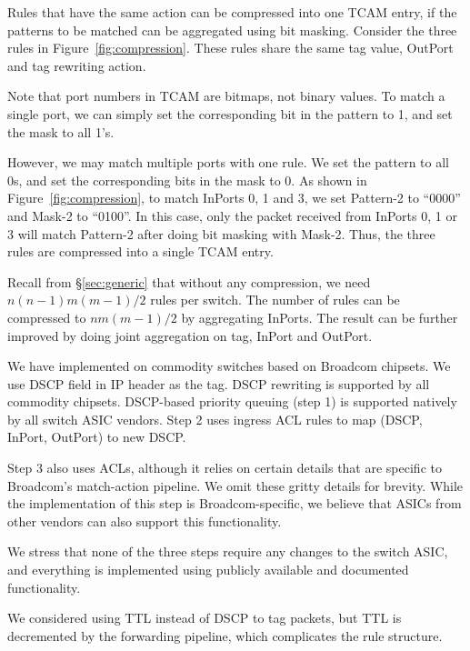 Rules that have the same action can be compressed into one TCAM entry, if the
patterns to be matched can be aggregated using bit masking. Consider the three
rules in Figure~\ref{fig:compression}. These rules share the same tag value,
OutPort and tag rewriting action.

Note that port numbers in TCAM are bitmaps, not binary values. To match a single 
port, we can simply set the corresponding bit in the pattern to 1, and set the mask to all 1's. 

However, we may match multiple ports with one rule. We set the pattern to 
all 0s, and set the corresponding bits in the mask to 0. As shown in Figure~\ref{fig:compression},  
to match InPorts 0, 1 and 3, we set Pattern-2 to ``0000''  and Mask-2 to ``0100''. In this case, 
only the packet received from InPorts 0, 1 or 3 will match Pattern-2 after doing bit masking with Mask-2. 
Thus, the three \sysname{} rules are compressed into a single TCAM entry.

Recall from \S\ref{sec:generic} that without any compression, we need
$n(n-1)m(m-1)/2$ rules per switch. The number of rules can be
compressed to $nm(m-1)/2$ by aggregating InPorts.  The
result can be further improved by doing joint aggregation on tag, InPort and
OutPort.

 We have implemented \sysname{} on commodity
switches based on Broadcom chipsets.  We use DSCP field in IP header as the tag.
DSCP rewriting is supported by all commodity chipsets. DSCP-based priority
queuing (step 1) is supported natively by all switch ASIC vendors. Step 2 uses
ingress ACL rules to map (DSCP, InPort, OutPort) to new DSCP.

Step 3 also uses ACLs, although it relies on certain details that are specific
to Broadcom's match-action pipeline. We omit these gritty details for brevity.
While the implementation of this step is Broadcom-specific, we believe that
ASICs from other vendors can also support this functionality.

We stress that none of the three steps require any changes to the switch ASIC,
and everything is implemented using publicly available and documented
functionality.

We considered using TTL instead of DSCP to tag packets, but TTL is decremented
by the forwarding pipeline, which complicates the rule structure.

